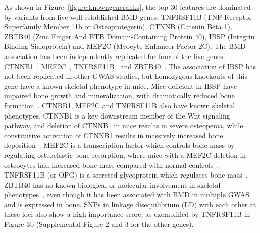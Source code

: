\documentclass[10pt,letterpaper]{article}
\begin{document}
As shown in Figure~\ref{figure:knowngeneranks}, the top 30 features are dominated by variants from five well established BMD genes; TNFRSF11B (TNF Receptor Superfamily Member 11b or Osteoprotegerin), CTNNB (Catenin Beta 1), ZBTB40 (Zinc Finger And BTB Domain-Containing Protein 40), IBSP (Integrin Binding Sialoprotein) and MEF2C (Myocyte Enhancer Factor 2C). 
The BMD association has been independently replicated for four of the five genes: CTNNB1~\cite{Pei2016, Rivadeneira2009}, MEF2C~\cite{Pei2016a}, TNFRSF11B~\cite{Rivadeneira2009,Zhang2014,Kemp2014,Paternoster2013} and ZBTB40~\cite{Rivadeneira2009,  Zhang2014,Nielson2016}. The association of IBSP has not been replicated in other GWAS studies, but homozygous knockouts of this gene have a known skeletal phenotype in mice. Mice deficient in IBSP have impaired bone growth and mineralization, with dramatically reduced bone formation~\cite{Malaval2008}. CTNBB1, MEF2C and TNFRSF11B also have known skeletal phenotypes. CTNNB1 is a key downstream member of the Wnt signaling pathway, and deletion of CTNNB1 in mice results in severe osteopenia, while constitutive activation of CTNNB1 results in massively increased bone deposition~\cite{Holmen2005}. MEF2C is a transcription factor which controls bone mass by regulating osteoclastic bone resorption, where mice with a MEF2C deletion in osteocytes had increased bone mass compared with normal controls~\cite{Kramer2012}. TNFRSF11B (or OPG) is a secreted glycoprotein which regulates bone mass~\cite{Simonet1997}. ZBTB40 has no known biological or molecular involvement in skeletal phenotypes~\cite{Styrkarsdottir2008}, even though it has been associated with BMD in multiple GWAS and is expressed in bone.
SNPs in linkage disequilibrium (LD) with each other at these loci also show a high importance score, as exemplified by TNFRSF11B in Figure 3b (Supplemental Figure 2 and 3 for the other genes). %

\end{document}
